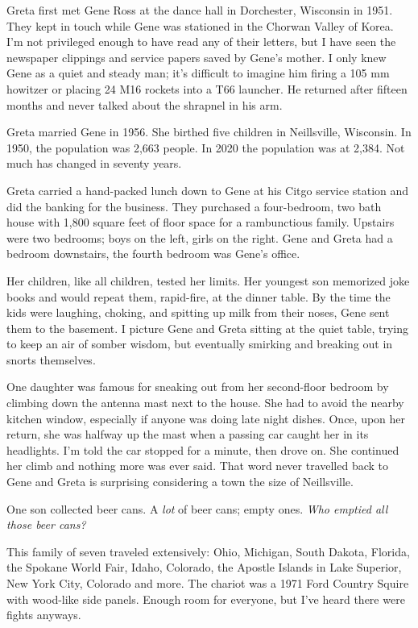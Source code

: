 \documentclass[
  letterpaper,
  DIV=11,
  numbers=noendperiod]{scrreprt}
\begin{document}
Greta first met Gene Ross at the dance hall in Dorchester, Wisconsin in
1951. They kept in touch while Gene was stationed in the Chorwan Valley
of Korea. I'm not privileged enough to have read any of their letters,
but I have seen the newspaper clippings and service papers saved by
Gene's mother. I only knew Gene as a quiet and steady man; it's
difficult to imagine him firing a 105 mm howitzer or placing 24 M16
rockets into a T66 launcher. He returned after fifteen months and never
talked about the shrapnel in his arm.

Greta married Gene in 1956. She birthed five children in Neillsville,
Wisconsin. In 1950, the population was 2,663 people. In 2020 the
population was at 2,384. Not much has changed in seventy years.

Greta carried a hand-packed lunch down to Gene at his Citgo service
station and did the banking for the business. They purchased a
four-bedroom, two bath house with 1,800 square feet of floor space for a
rambunctious family. Upstairs were two bedrooms; boys on the left, girls
on the right. Gene and Greta had a bedroom downstairs, the fourth
bedroom was Gene's office.

Her children, like all children, tested her limits. Her youngest son
memorized joke books and would repeat them, rapid-fire, at the dinner
table. By the time the kids were laughing, choking, and spitting up milk
from their noses, Gene sent them to the basement. I picture Gene and
Greta sitting at the quiet table, trying to keep an air of somber
wisdom, but eventually smirking and breaking out in snorts themselves.

One daughter was famous for sneaking out from her second-floor bedroom
by climbing down the antenna mast next to the house. She had to avoid
the nearby kitchen window, especially if anyone was doing late night
dishes. Once, upon her return, she was halfway up the mast when a
passing car caught her in its headlights. I'm told the car stopped for a
minute, then drove on. She continued her climb and nothing more was ever
said. That word never travelled back to Gene and Greta is surprising
considering a town the size of Neillsville.

One son collected beer cans. A \emph{lot} of beer cans; empty ones.
\emph{Who emptied all those beer cans?}

This family of seven traveled extensively: Ohio, Michigan, South Dakota,
Florida, the Spokane World Fair, Idaho, Colorado, the Apostle Islands in
Lake Superior, New York City, Colorado and more. The chariot was a 1971
Ford Country Squire with wood-like side panels. Enough room for
everyone, but I've heard there were fights anyways.
\end{document}
